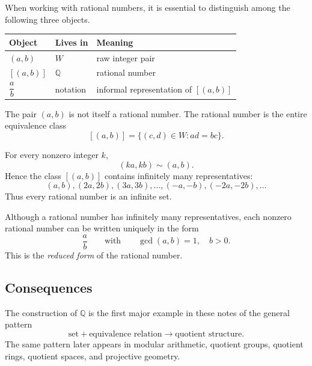 \begin{remark*}
\label{rem:rational-three-levels}

When working with rational numbers, it is essential to distinguish among the following three objects.

\begin{center}
\begin{tabular}{lll}
\toprule
\textbf{Object} & \textbf{Lives in} & \textbf{Meaning} \\
\midrule
$(a,b)$ & $W$ & raw integer pair \\
$[(a,b)]$ & $\mathbb{Q}$ & rational number \\
$\dfrac{a}{b}$ & notation & informal representation of $[(a,b)]$ \\
\bottomrule
\end{tabular}
\end{center}

The pair $(a,b)$ is not itself a rational number.  The rational number is the entire equivalence
class
\[
[(a,b)] = \{(c,d)\in W : ad = bc\}.
\]

\end{remark*}

\begin{remark*}
\label{rem:rational-infinite-set}

For every nonzero integer $k$,
\[
(ka,kb)\sim(a,b).
\]
Hence the class $[(a,b)]$ contains infinitely many representatives:
\[
(a,b),(2a,2b),(3a,3b),\dots,(-a,-b),(-2a,-2b),\dots
\]
Thus every rational number is an infinite set.
\end{remark*}

\begin{remark*}
\label{rem:reduced-rational}

Although a rational number has infinitely many representatives, each nonzero rational number can be
written uniquely in the form
\[
\frac{a}{b}
\qquad\text{with}\qquad
\gcd(a,b)=1,
\quad b>0.
\]
This is the \emph{reduced form} of the rational number.

\end{remark*}

\subsection*{Consequences}

\begin{remark*}
\label{rem:quotient-pattern}

The construction of $\mathbb{Q}$ is the first major example in these notes of the general pattern
\[
\text{set} + \text{equivalence relation} \longrightarrow \text{quotient structure}.
\]
The same pattern later appears in modular arithmetic, quotient groups, quotient rings, quotient
spaces, and projective geometry.

\end{remark*}

